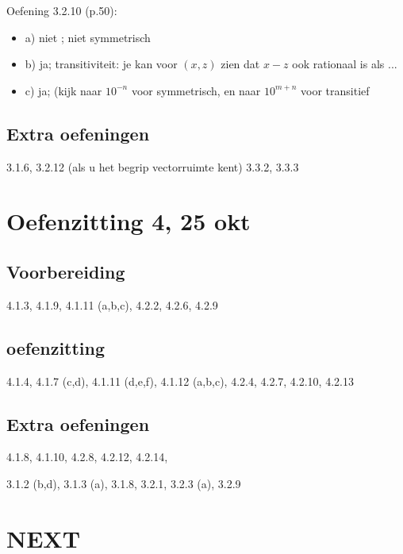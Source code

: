 \documentclass{article}
\begin{document}
Oefening 3.2.10 (p.50): 
\begin{itemize}
    \item a) niet ; niet symmetrisch
    \item b) ja; transitiviteit: je kan voor $(x,z)$ zien dat $x-z$ ook rationaal is als ...
    \item c) ja; (kijk naar $10^{-n}$ voor symmetrisch, en naar $10^{m+n}$ voor transitief
\end{itemize}

\subsection*{Extra oefeningen} 

3.1.6, 
3.2.12 (als u het begrip vectorruimte kent)
3.3.2, 
3.3.3 


\section*{Oefenzitting 4, 25 okt} 


\subsection*{Voorbereiding}

4.1.3, 4.1.9, 4.1.11 (a,b,c), 4.2.2, 4.2.6, 4.2.9 



\subsection*{oefenzitting} 

4.1.4, 4.1.7 (c,d), 4.1.11 (d,e,f), 4.1.12 (a,b,c), 4.2.4, 4.2.7, 4.2.10, 4.2.13 

\subsection{Extra oefeningen}

 4.1.8, 4.1.10, 4.2.8, 4.2.12, 4.2.14,

3.1.2 (b,d), 3.1.3 (a), 3.1.8, 3.2.1, 3.2.3 (a), 3.2.9




\section*{NEXT}
\end{document}
